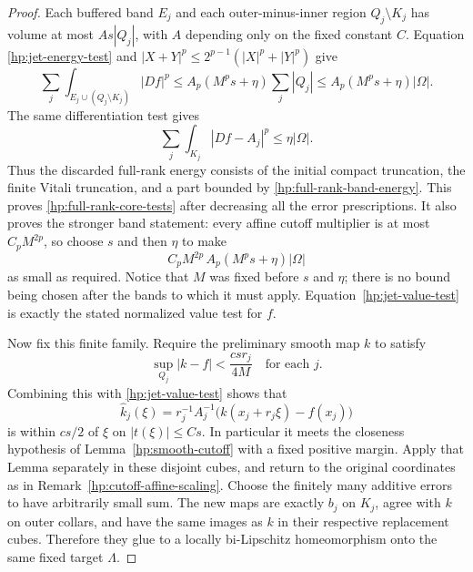 \documentclass[11pt]{article}
\numberwithin{equation}{section}
\theoremstyle{definition}
\theoremstyle{remark}
\begin{document}
\begin{proof}
Each buffered band $E_j$ and each outer-minus-inner region
$Q_j\setminus K_j$ has volume at most $A s|Q_j|$, with $A$ depending
only on the fixed constant $C$.  Equation
\eqref{hp:jet-energy-test} and
$|X+Y|^p\leq2^{p-1}(|X|^p+|Y|^p)$ give
\begin{equation}\label{hp:full-rank-band-energy}
 \sum_j\int_{E_j\cup(Q_j\setminus K_j)}|Df|^p
 \leq A_p(M^ps+\eta)\sum_j|Q_j|
 \leq A_p(M^ps+\eta)|\Omega|.
\end{equation}
The same differentiation test gives
\begin{equation}\label{hp:full-rank-core-error}
 \sum_j\int_{K_j}|Df-A_j|^p\leq\eta|\Omega|.
\end{equation}
Thus the discarded full-rank energy consists of the initial compact
truncation, the finite Vitali truncation, and a part bounded by
\eqref{hp:full-rank-band-energy}.  This proves
\eqref{hp:full-rank-core-tests} after decreasing all the error
prescriptions.  It also proves the stronger band statement: every
affine cutoff multiplier is at most $C_pM^{2p}$, so choose $s$ and
then $\eta$ to make
\[
 C_pM^{2p}\,A_p(M^ps+\eta)|\Omega|
\]
as small as required.  Notice that $M$ was fixed before $s$ and
$\eta$; there is no bound being chosen after the bands to which it
must apply.  Equation~\eqref{hp:jet-value-test} is exactly the
stated normalized value test for $f$.

Now fix this finite family.  Require the preliminary smooth map
$k$ to satisfy
\begin{equation}\label{hp:preliminary-value-test}
 \sup_{Q_j}|k-f|<\frac{csr_j}{4M}
 \quad\text{for each }j.
\end{equation}
Combining this with \eqref{hp:jet-value-test} shows that
\[
 \widehat k_j(\xi)
 =r_j^{-1}A_j^{-1}\bigl(k(x_j+r_j\xi)-f(x_j)\bigr)
\]
is within $cs/2$ of $\xi$ on $|t(\xi)|\leq Cs$.
In particular it meets the closeness hypothesis of
Lemma~\ref{hp:smooth-cutoff} with a fixed positive margin.  Apply
that Lemma separately in these disjoint cubes, and return to the
original coordinates as in
Remark~\ref{hp:cutoff-affine-scaling}.  Choose the finitely many
additive errors to have arbitrarily small sum.  The new maps are
exactly $b_j$ on $K_j$, agree with $k$ on outer collars, and have
the same images as $k$ in their respective replacement cubes.
Therefore they glue to a locally bi-Lipschitz homeomorphism onto
the same fixed target $\Lambda$.


\end{proof}
\end{document}
